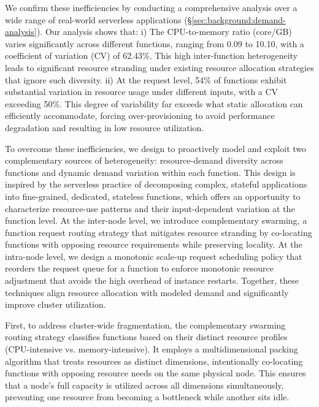 We confirm these inefficiencies by conducting a comprehensive analysis over a wide range of real-world serverless applications (\S\ref{sec:background:demand-analysis}). Our analysis shows that: i) The CPU-to-memory ratio (core/GB) varies significantly across different functions, ranging from 0.09 to 10.10, with a coefficient of variation (CV) of 62.43\%. This high inter-function heterogeneity leads to significant resource stranding under existing resource allocation strategies that ignore such diversity. ii) At the request level, 54\% of functions exhibit substantial variation in resource usage under different inputs, with a CV exceeding 50\%. This degree of variability far exceeds what static allocation can efficiently accommodate, forcing over-provisioning to avoid performance degradation and resulting in low resource utilization.

To overcome these inefficiencies, we design \sysname to proactively model and exploit two complementary sources of heterogeneity: resource-demand diversity across functions and dynamic demand variation within each function. This design is inspired by the serverless practice of decomposing complex, stateful applications into fine-grained, dedicated, stateless functions, which offers an opportunity to characterize resource-use patterns and their input-dependent variation at the function level. At the inter-node level, we introduce complementary swarming, a function request routing strategy that mitigates resource stranding by co-locating functions with opposing resource requirements while preserving locality. At the intra-node level, we design a monotonic scale-up request scheduling policy that reorders the request queue for a function to enforce monotonic resource adjustment that avoids the high overhead of instance restarts. Together, these techniques align resource allocation with modeled demand and significantly improve cluster utilization.

First, to address cluster-wide fragmentation, the complementary swarming routing strategy classifies functions based on their distinct resource profiles (\eg CPU-intensive vs. memory-intensive). It employs a multidimensional packing algorithm that treats resources as distinct dimensions, intentionally co-locating functions with opposing resource needs on the same physical node. This ensures that a node's full capacity is utilized across all dimensions simultaneously, preventing one resource from becoming a bottleneck while another sits idle.

